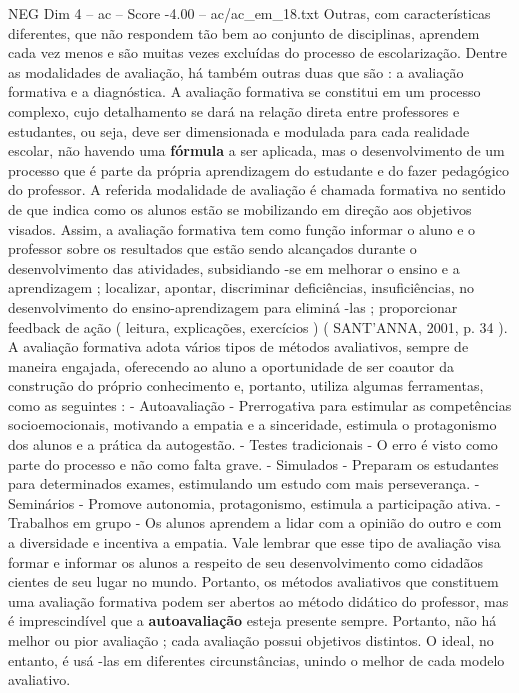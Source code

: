 \begin{textsample}{NEG Dim 4 – ac – Score -4.00 – ac/ac\_em\_18.txt}
Outras, com características diferentes, que não respondem tão bem ao conjunto de disciplinas, aprendem cada vez menos e são muitas vezes excluídas do processo de escolarização.
Dentre as modalidades de avaliação, há também outras duas que são : a avaliação formativa e a diagnóstica.
A avaliação formativa se constitui em um processo complexo, cujo detalhamento se dará na relação direta entre professores e estudantes, ou seja, deve ser dimensionada e modulada para cada realidade escolar, não havendo uma \textbf{fórmula} a ser aplicada, mas o desenvolvimento de um processo que é parte da própria aprendizagem do estudante e do fazer pedagógico do professor.
A referida modalidade de avaliação é chamada formativa no sentido de que indica como os alunos estão se mobilizando em direção aos objetivos visados.
Assim, a avaliação formativa tem como função informar o aluno e o professor sobre os resultados que estão sendo alcançados durante o desenvolvimento das atividades, subsidiando -se em melhorar o ensino e a aprendizagem ; localizar, apontar, discriminar deficiências, insuficiências, no desenvolvimento do ensino-aprendizagem para eliminá -las ; proporcionar feedback de ação ( leitura, explicações, exercícios ) ( SANT’ANNA, 2001, p. 34 ).
A avaliação formativa adota vários tipos de métodos avaliativos, sempre de maneira engajada, oferecendo ao aluno a oportunidade de ser coautor da construção do próprio conhecimento e, portanto, utiliza algumas ferramentas, como as seguintes : - Autoavaliação - Prerrogativa para estimular as competências socioemocionais, motivando a empatia e a sinceridade, estimula o protagonismo dos alunos e a prática da autogestão. - Testes tradicionais - O erro é visto como parte do processo e não como falta grave. - Simulados - Preparam os estudantes para determinados exames, estimulando um estudo com mais perseverança. - Seminários - Promove autonomia, protagonismo, estimula a participação ativa. - Trabalhos em grupo - Os alunos aprendem a lidar com a opinião do outro e com a diversidade e incentiva a empatia.
Vale lembrar que esse tipo de avaliação visa formar e informar os alunos a respeito de seu desenvolvimento como cidadãos cientes de seu lugar no mundo.
Portanto, os métodos avaliativos que constituem uma avaliação formativa podem ser abertos ao método didático do professor, mas é imprescindível que a \textbf{autoavaliação} esteja presente sempre.
Portanto, não há melhor ou pior avaliação ; cada avaliação possui objetivos distintos.
O ideal, no entanto, é usá -las em diferentes circunstâncias, unindo o melhor de cada modelo avaliativo.

\end{textsample}
